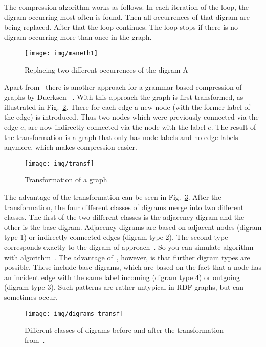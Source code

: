 \documentclass[a4paper]{scrartcl}
\begin{document}
The compression algorithm works as follows. In each iteration of the loop, the digram occurring most often is found. Then all occurrences of that digram are being replaced. After that the loop continues. The loop stops if there is no digram occurring more than once in the graph.

\begin{figure}[h]
	\centering
	\texttt{[image: img/maneth1]}
	\caption{Replacing two different occurrences of the digram A~\cite{maneth}}
	\label{fig:maneth1}
\end{figure}

Apart from~\cite{maneth} there is another approach for a grammar-based compression of graphs by Duerksen~\cite{mattdk} . With this approach the graph is first transformed, as illustrated in Fig.~\ref{fig:transf}. There for each edge a new node (with the former label of the edge) is introduced. Thus two nodes which were previously connected via the edge $e$, are now indirectly connected via the node with the label $e$. The result of the transformation is a graph that only has node labels and no edge labels anymore, which makes compression easier.

\begin{figure}[h]
	\centering
	\texttt{[image: img/transf]}
	\caption{Transformation of a graph~\cite{mattdk}}
	\label{fig:transf}
\end{figure}

The advantage of the transformation can be seen in Fig.~\ref{fig:digrams_transf}. After the transformation, the four different classes of digrams merge into two different classes. The first of the two different classes is the adjacency digram and the other is the base digram. Adjacency digrams are based on adjacent nodes (digram type 1) or indirectly connected edges (digram type 2). The second type corresponds exactly to the digram of approach~\cite{maneth}. So you can simulate algorithm~\cite{maneth} with algorithm~\cite{mattdk}. The advantage of~\cite{mattdk}, however, is that further digram types are possible. These include base digrams, which are based on the fact that a node has an incident edge with the same label incoming (digram type 4) or outgoing (digram type 3). Such patterns are rather untypical in RDF graphs, but can sometimes occur.

\begin{figure}[h]
	\centering
	\texttt{[image: img/digrams\_transf]}
	\caption{Different classes of digrams before and after the transformation from~\cite{mattdk}.}
	\label{fig:digrams_transf}
\end{figure}
\end{document}
